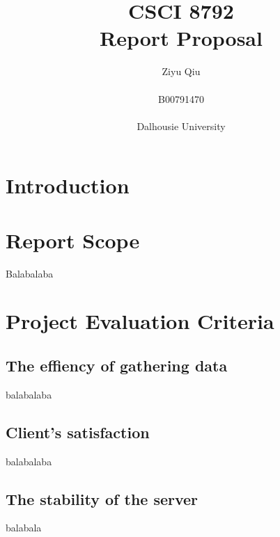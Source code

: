\documentclass[20pt]{article}
\title{CSCI 8792  \\ Report Proposal }
\author{Ziyu Qiu \\  \\ B00791470 \\ \\ Dalhousie University}
\begin{document}
\maketitle

\newpage

\section*{Introduction}

\section*{Report Scope}
Balabalaba

\section*{Project Evaluation Criteria}
\subsection*{The effiency of gathering data}
balabalaba
\subsection*{Client’s satisfaction}
balabalaba
\subsection*{The stability of the server}
balabala
\vspace{0.5in}
\pagebreak
\end{document}
